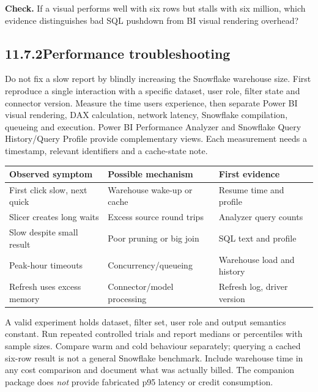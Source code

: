 \documentclass[11pt,twoside]{article}
\newcommand{\topic}[2]{\subsection*{#1\quad #2}}
\begin{document}
\textbf{Check.} If a visual performs well with six rows but stalls with six million, which evidence distinguishes bad SQL pushdown from BI visual rendering overhead?
\newpage
\topic{11.7.2}{Performance troubleshooting}
Do not fix a slow report by blindly increasing the Snowflake warehouse size. First reproduce a single interaction with a specific dataset, user role, filter state and connector version. Measure the time users experience, then separate Power BI visual rendering, DAX calculation, network latency, Snowflake compilation, queueing and execution. Power BI Performance Analyzer and Snowflake Query History/Query Profile provide complementary views. Each measurement needs a timestamp, relevant identifiers and a cache-state note.
\begin{center}\renewcommand{\arraystretch}{1.12}\begin{tabularx}{\linewidth}{@{}p{32mm}XX@{}}\toprule
\textbf{Observed symptom}&\textbf{Possible mechanism}&\textbf{First evidence}\\\midrule
First click slow, next quick&Warehouse wake-up or cache&Resume time and profile\\
Slicer creates long waits&Excess source round trips&Analyzer query counts\\
Slow despite small result&Poor pruning or big join&SQL text and profile\\
Peak-hour timeouts&Concurrency/queueing&Warehouse load and history\\
Refresh uses excess memory&Connector/model processing&Refresh log, driver version\\\bottomrule\end{tabularx}\end{center}
A valid experiment holds dataset, filter set, user role and output semantics constant. Run repeated controlled trials and report medians or percentiles with sample sizes. Compare warm and cold behaviour separately; querying a cached six-row result is not a general Snowflake benchmark. Include warehouse time in any cost comparison and document what was actually billed. The companion package does \emph{not} provide fabricated p95 latency or credit consumption.
\end{document}
